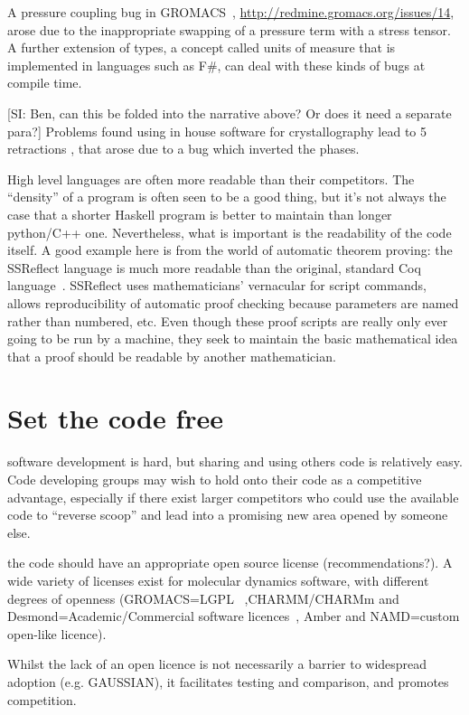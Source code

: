 \documentclass[conference]{IEEEtran}
\begin{document}
A pressure coupling bug in GROMACS~\cite{Hess2008},
\url{http://redmine.gromacs.org/issues/14}, arose due to the
inappropriate swapping of a pressure term with a stress tensor.  A
further extension of types, a concept called units of measure that is
implemented in languages such as F\#, can deal with these kinds of
bugs at compile time.

[SI: Ben, can this be folded into the narrative above? Or does it need a separate para?]
Problems found using in house software for crystallography lead to 5
retractions \cite{Miller2006}, that arose due to a bug which inverted
the phases.

High level languages are often more readable than their
competitors. The ``density'' of a program is often seen to be a good
thing, but it's not always the case that a shorter Haskell program is
better to maintain than longer python/C++ one. Nevertheless, what is
important is the readability of the code itself. A good example here
is from the world of automatic theorem proving: the SSReflect language
is much more readable than the original, standard Coq
language~\cite{GonthierZND13}. SSReflect uses mathematicians'
vernacular for script commands, allows reproducibility of automatic
proof checking because parameters are named rather than numbered,
etc. Even though these proof scripts are really only ever going to be
run by a machine, they seek to maintain the basic mathematical idea
that a proof should be readable by another mathematician.


\section{Set the code free} 

software development is hard, but sharing and using others code is
relatively easy. Code developing groups may wish to hold onto their
code as a competitive advantage, especially if there exist larger
competitors who could use the available code to ``reverse scoop'' and
lead into a promising new area opened by someone else.

the code should have an appropriate open source license
(recommendations?). A wide variety of licenses exist for molecular
dynamics software, with different degrees of openness (GROMACS=LGPL~\cite{Hess2008}
,CHARMM/CHARMm and Desmond=Academic/Commercial software licences~\cite{Brooks2009,Bowers2006}, Amber
and NAMD=custom open-like licence).

Whilst the lack of an open licence is not necessarily a barrier to
widespread adoption (e.g. GAUSSIAN), it facilitates testing and
comparison, and promotes competition.
\end{document}
